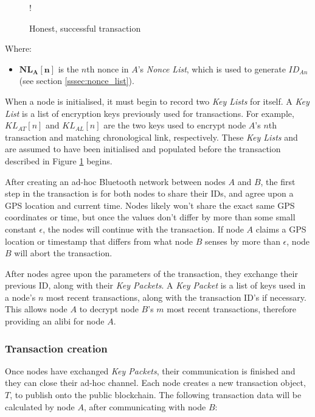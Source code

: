 \documentclass[12pt]{article}
\begin{document}
\begin{figure}[H]
\resizebox {\columnwidth} {!} {}
\caption{Honest, successful transaction}
\label{fig:transaction}
\end{figure}

Where:
\begin{itemize}[noitemsep,topsep=0pt]
	\item[] $\mathbf{NL_A[n]}$ is the $n$th nonce in $A$'s \textit{Nonce List}, which is used to generate $ID_{An}$ (see section \ref{sssec:nonce_list}).
\end{itemize}

\null
When a node is initialised, it must begin to record two \textit{Key Lists} for itself. A \textit{Key List} is a list of encryption keys previously used for transactions. For example, $KL_{AT}[n]$ and $KL_{AL}[n]$ are the two keys used to encrypt node $A$'s $n$th transaction and matching chronological link, respectively. These \textit{Key Lists} and are assumed to have been initialised and populated before the transaction described in Figure \ref{fig:transaction} begins.

After creating an ad-hoc Bluetooth network between nodes $A$ and $B$, the first step in the transaction is for both nodes to share their IDs, and agree upon a GPS location and current time. Nodes likely won't share the exact same GPS coordinates or time, but once the values don't differ by more than some small constant $\epsilon$, the nodes will continue with the transaction. If node $A$ claims a GPS location or timestamp that differs from what node $B$ senses by more than $\epsilon$, node $B$ will abort the transaction.

After nodes agree upon the parameters of the transaction, they exchange their previous ID, along with their \textit{Key Packets}. A \textit{Key Packet} is a list of keys used in a node's $n$ most recent transactions, along with the transaction ID's if necessary. This allows node $A$ to decrypt node $B$'s $m$ most recent transactions, therefore providing an alibi for node $A$.

\subsubsection{Transaction creation}
Once nodes have exchanged \textit{Key Packets}, their communication is finished and they can close their ad-hoc channel. Each node creates a new transaction object, $T$, to publish onto the public blockchain. The following transaction data will be calculated by node $A$, after communicating with node $B$:
\\
\end{document}
